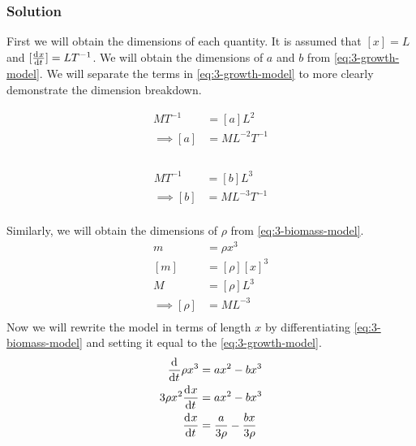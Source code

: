 \documentclass[12pt]{article}
\begin{document}
\subsubsection*{Solution}
First we will obtain the dimensions of each quantity. It is assumed that $[x]=L$
and $[\frac{\mathrm{d}^{} {x}}{\mathrm{d}{t}^{}}]=LT^{-1}$. We will obtain the dimensions of $a$ and $b$ from
\cref{eq:3-growth-model}. We will separate the terms in \cref{eq:3-growth-model} to
more clearly demonstrate the dimension breakdown.
\vspace{-2em}
\begin{multicols}{2}
  \begin{equation*}
    \begin{aligned}
      MT^{-1} &= [a]L^2 \\
      \implies [a] &= ML^{-2}T^{-1} \\
    \end{aligned}
  \end{equation*} \\
  \begin{equation*}
    \begin{aligned}
      MT^{-1} &= [b]L^3 \\
      \implies [b] &= ML^{-3}T^{-1} \\
    \end{aligned}
  \end{equation*}
\end{multicols}
\noindent
Similarly, we will obtain the dimensions of $\rho$ from \cref{eq:3-biomass-model}.
\begin{equation*}
  \begin{aligned}
    m &= \rho x^3 \\
    [m] &= [\rho] [x]^3 \\
    M &= [\rho] L^3 \\
    \implies [\rho] &= ML^{-3} \\
  \end{aligned}
\end{equation*}
Now we will rewrite the model in terms of length $x$ by differentiating \cref{eq:3-biomass-model} and
setting it equal to the \cref{eq:3-growth-model}.
\begin{equation}
  \begin{aligned}
    \label{eq:model-in-terms-of-x}
    \frac{\mathrm{d}^{} {}}{\mathrm{d}{t}^{}}\rho x^3 &= ax^2-bx^3 \\
    3\rho x^2\frac{\mathrm{d}^{} {x}}{\mathrm{d}{t}^{}} &= ax^2-bx^3 \\
    \frac{\mathrm{d}^{} {x}}{\mathrm{d}{t}^{}} &= \frac{a}{3\rho} - \frac{bx}{3\rho} \\
  \end{aligned}
\end{equation}
\end{document}
